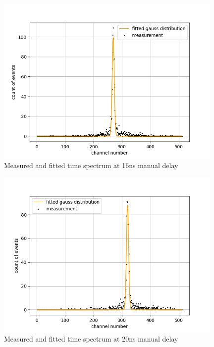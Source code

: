 \begin{figure}[H]
    \centering
    \includegraphics[width=110mm,scale=0.5]{Positronium/include/timecalibration4.png}
    \caption{Measured and fitted time spectrum at 16ns manual delay} 
   
\end{figure}

\begin{figure}[H]
    \centering
    \includegraphics[width=110mm,scale=0.5]{Positronium/include/timecalibration5.png}
    \caption{Measured and fitted time spectrum at 20ns manual delay} 
   
\end{figure}

